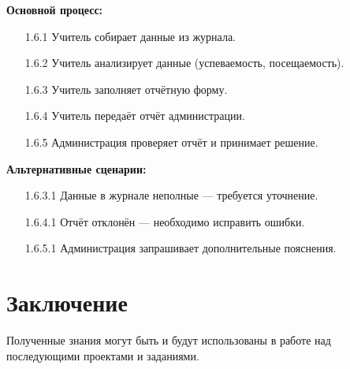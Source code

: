 \documentclass[a4paper, final]{article}
\begin{document}
\textbf{Основной процесс:}
\begin{enumerate}
\item[1.6.1] Учитель собирает данные из журнала.
\item[1.6.2] Учитель анализирует данные (успеваемость, посещаемость).
\item[1.6.3] Учитель заполняет отчётную форму.
\item[1.6.4] Учитель передаёт отчёт администрации.
\item[1.6.5] Администрация проверяет отчёт и принимает решение.
\end{enumerate}

\textbf{Альтернативные сценарии:}
\begin{itemize}
\item[1.6.3.1] Данные в журнале неполные --- требуется уточнение.
\item[1.6.4.1] Отчёт отклонён --- необходимо исправить ошибки.
\item[1.6.5.1] Администрация запрашивает дополнительные пояснения.
\end{itemize}

\newpage
\section*{Заключение}
Полученные знания могут быть и будут использованы в работе над последующими проектами и заданиями.

\cleardoublepage
{}
\newpage
\begin{thebibliography}{0}
\end{thebibliography}
\end{document}

